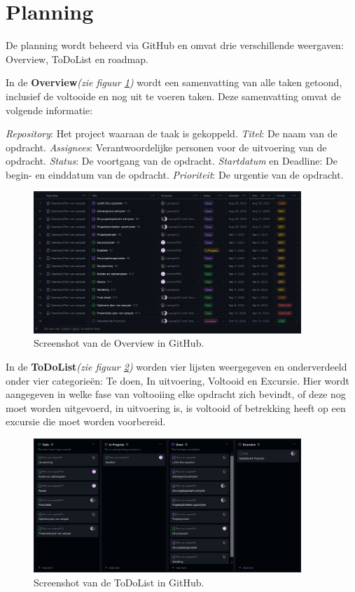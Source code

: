 \section{Planning} \label{planning}
De planning wordt beheerd via GitHub en omvat drie verschillende weergaven: Overview, ToDoList en roadmap.

In de \textbf{Overview}\textit{(zie figuur \ref{fig:overview})} wordt een samenvatting van alle taken getoond, inclusief de voltooide en nog uit te voeren taken. Deze samenvatting omvat de volgende informatie:

    \textit{Repository}: Het project waaraan de taak is gekoppeld.
    \textit{Titel}: De naam van de opdracht.
    \textit{Assignees}: Verantwoordelijke personen voor de uitvoering van de opdracht.
    \textit{Status}: De voortgang van de opdracht.
    \textit{Startdatum} en Deadline: De begin- en einddatum van de opdracht.
    \textit{Prioriteit}: De urgentie van de opdracht.

\begin{figure}[h]
\centering
\includegraphics[width=0.9\textwidth]{IMG/overview.PNG}
\caption{Screenshot van de Overview in GitHub.}
\label{fig:overview}
\end{figure}

\newpage

In de \textbf{ToDoList}\textit{(zie figuur \ref{fig:todolist})} worden vier lijsten weergegeven en onderverdeeld onder vier categorieën: Te doen, In uitvoering, Voltooid en Excursie. Hier wordt aangegeven in welke fase van voltooiing elke opdracht zich bevindt, of deze nog moet worden uitgevoerd, in uitvoering is, is voltooid of betrekking heeft op een excursie die moet worden voorbereid.

\begin{figure}[h]
\centering
\includegraphics[width=0.9\textwidth]{IMG/todolist.PNG}
\caption{Screenshot van de ToDoList in GitHub.}
\label{fig:todolist}
\end{figure}

